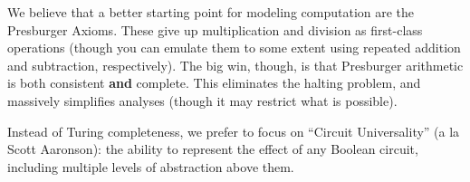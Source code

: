 \documentclass[preprint]{{acmart}}
\begin{document}
We believe that a better starting point for modeling computation are the
Presburger Axioms. These give up multiplication and division as
first-class operations (though you can emulate them to some extent using
repeated addition and subtraction, respectively). The big win, though, is
that Presburger arithmetic is both consistent \textbf{and} complete. This
eliminates the halting problem, and massively simplifies analyses (though
it may restrict what is possible).%

Instead of Turing completeness, we prefer to focus on \textquotedblleft{}Circuit
Universality\textquotedblright{} (a la Scott Aaronson): the ability to represent the effect
of any Boolean circuit, including multiple levels of abstraction above
them.%
\end{document}
